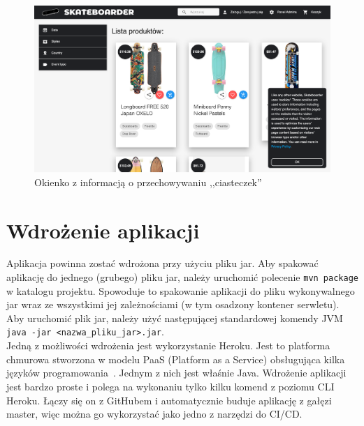 \documentclass[12pt,a4paper,titlepage]{article}
\begin{document}
\begin{figure}[H]
    \centering
    \includegraphics[width=15cm]{Pics/cookies.png}
    \caption{Okienko z informacją o przechowywaniu ,,ciasteczek''}
    \label{pic:cookies}
\end{figure}

\newpage
\section{Wdrożenie aplikacji}
Aplikacja powinna zostać wdrożona przy użyciu pliku jar. Aby spakować aplikację do jednego (grubego) pliku jar, należy uruchomić polecenie \texttt{mvn package} w katalogu projektu. Spowoduje to spakowanie aplikacji do pliku wykonywalnego jar wraz ze wszystkimi jej zależnościami (w tym osadzony kontener serwletu). Aby uruchomić plik jar, należy użyć następującej standardowej komendy JVM \texttt{java -jar <nazwa_pliku_jar>.jar}.\\

Jedną z możliwości wdrożenia jest wykorzystanie Heroku. Jest to platforma chmurowa stworzona w modelu PaaS (Platform as a Service) obsługująca kilka języków programowania~\cite{heroku}. Jednym z nich jest właśnie Java. Wdrożenie aplikacji jest bardzo proste i polega na wykonaniu tylko kilku komend z poziomu CLI Heroku. Łączy się on z GitHubem i automatycznie buduje aplikację z gałęzi master, więc można go wykorzystać jako jedno z narzędzi do CI/CD.

\newpage
\end{document}
